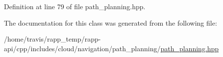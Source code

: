 Definition at line 79 of file path\-\_\-planning.\-hpp.



The documentation for this class was generated from the following file\-:\begin{DoxyCompactItemize}
\item 
/home/travis/rapp\-\_\-temp/rapp-\/api/cpp/includes/cloud/navigation/path\-\_\-planning/\hyperlink{path__planning_8hpp}{path\-\_\-planning.\-hpp}\end{DoxyCompactItemize}
